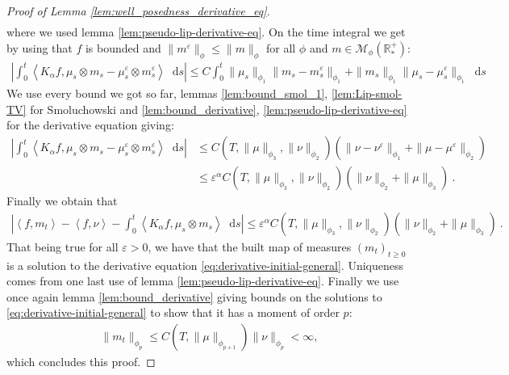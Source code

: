 \documentclass[11pt,a4paper]{article}
\newcommand{\RRP}{\mathbb{R}^+_*}
\newcommand{\MC}{\mathcal{M}}
\newcommand{\Proc}[1]{\left(#1\right)_{t\geq 0}}
\newcommand{\brac}[1]{\left\langle#1\right\rangle}
\newcommand{\dd}{\mathop{}\!\mathrm{d}}
\begin{document}
\begin{proof}[Proof of Lemma \ref{lem:well_posedness_derivative_eq}]
\begin{align*}
    \end{align*}
    where we used lemma \ref{lem:pseudo-lip-derivative-eq}. On the time integral we get by using that $f$ is bounded and $\|m^\varepsilon\|_{\phi} \leq \|m\|_\phi$ for all $\phi$ and $m \in \MC_{\phi}(\RRP)$:
    \begin{align*}
        \left|\int_0^t \brac{K_\alpha f,\mu_s \otimes m_s - \mu^\varepsilon_s \otimes m^\varepsilon_s} \dd s\right| 
        \leq C\int_0^t \|\mu_s\|_{\phi_1} \|m_s - m_s^\varepsilon\|_{\phi_1}+ \|m_s\|_{\phi_1} \|\mu_s - \mu_s^\varepsilon\|_{\phi_1}\dd s 
    \end{align*}
    We use every bound we got so far, lemmas \ref{lem:bound_smol_1}, \ref{lem:Lip-smol-TV} for Smoluchowski and \ref{lem:bound_derivative}, \ref{lem:pseudo-lip-derivative-eq} for the derivative equation giving:
    \begin{align*}
        \left|\int_0^t \brac{K_\alpha f,\mu_s \otimes m_s - \mu^\varepsilon_s \otimes m^\varepsilon_s} \dd s\right| 
        &\leq C(T,\|\mu\|_{\phi_3},\|\nu\|_{\phi_2})\left(\| \nu - \nu^\varepsilon\|_{\phi_1} + \| \mu - \mu^\varepsilon\|_{\phi_2}\right)\\
        &\leq \varepsilon^\alpha C(T,\|\mu\|_{\phi_3},\|\nu\|_{\phi_2})\left(\| \nu \|_{\phi_2} + \| \mu \|_{\phi_3}\right)\ .
    \end{align*}
    Finally we obtain that 
    \begin{align*}
        \left| \brac{f,m_t} - \brac{f,\nu} - \int_0^t \brac{K_\alpha f,\mu_s \otimes m_s} \dd s\right| \leq \varepsilon^\alpha C(T,\|\mu\|_{\phi_3},\|\nu\|_{\phi_2})\left(\| \nu \|_{\phi_2} + \| \mu \|_{\phi_3}\right)\ .
    \end{align*}
    That being true for all $\varepsilon > 0$, we have that the built map of measures $\Proc{m_t}$ is a solution to the derivative equation \eqref{eq:derivative-initial-general}. Uniqueness comes from one last use of lemma \ref{lem:pseudo-lip-derivative-eq}. Finally we use once again lemma \ref{lem:bound_derivative} giving bounds on the solutions to \eqref{eq:derivative-initial-general} to show that it has a moment of order $p$:
    \begin{align*}
        \| m_t \|_{\phi_p} \leq C(T,\|\mu\|_{\phi_{p+1}})\|\nu\|_{\phi_p} < \infty,
    \end{align*}
    which concludes this proof.
\end{proof}
\end{document}
